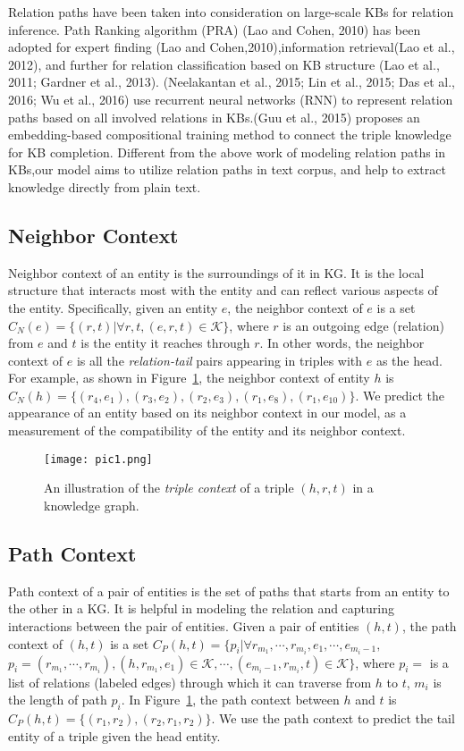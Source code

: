 Relation paths have been taken into consideration on large-scale KBs for relation inference. Path Ranking algorithm (PRA) (Lao and Cohen, 2010) has been adopted for expert finding (Lao and Cohen,2010),information retrieval(Lao et al., 2012), and further for relation classification based on KB structure (Lao et al., 2011; Gardner et al., 2013). (Neelakantan et al., 2015; Lin et al., 2015; Das et al., 2016; Wu et al., 2016) use recurrent neural networks (RNN) to represent relation paths based on all involved relations in KBs.(Guu et al., 2015) proposes an embedding-based compositional training method to connect the triple knowledge for KB completion. Different from the above work of modeling relation paths in KBs,our model aims to utilize relation paths in text corpus, and help to extract knowledge directly from plain text.

\subsection{Neighbor Context}
Neighbor context of an entity is the surroundings of it in KG. It is the local structure that interacts most with the entity and can reflect various aspects of the entity. Specifically, given an entity $e$, the neighbor context of $e$ is a set $C_N(e)=\{(r,t)|\forall r, t, (e,r,t)\in\mathcal{K}\}$, where $r$ is an outgoing edge (relation) from $e$ and $t$ is the entity it reaches through $r$. In other words, the neighbor context of $e$ is all the \textit{relation-tail} pairs appearing in triples with $e$ as the head. For example, as shown in Figure~\ref{pic1}, the neighbor context of entity $h$ is $C_N(h)=\{(r_4, e_1), (r_3, e_2), (r_2, e_3), (r_1, e_8), (r_1, e_{10})\}$. We predict the appearance of an entity based on its neighbor context in our model, as a measurement of the compatibility of the entity and its neighbor context.

\begin{figure}
  \texttt{[image: pic1.png]}
  \caption{An illustration of the \emph{triple context} of a triple $(h,r,t)$ in a knowledge graph.}
  \label{pic1}
\end{figure}


\subsection{Path Context}
Path context of a pair of entities is the set of paths that starts from an entity to the other in a KG. It is helpful in modeling the relation and capturing interactions between the pair of entities. Given a pair of entities $(h,t)$, the path context of $(h,t)$ is a set $C_P(h,t)=\{p_i | \forall r_{m_1}, \cdots, r_{m_i}, e_1, \cdots, e_{m_i-1},$ $p_i=(r_{m_1}, \cdots, r_{m_i}), (h,r_{m_1},e_1)\in\mathcal{K}, \cdots, (e_{m_i-1}, r_{m_i}, t)\in\mathcal{K}\}$, where $p_i=$ is a list of relations (labeled edges) through which it can traverse from $h$ to $t$, $m_i$ is the length of path $p_i$. In Figure~\ref{pic1}, the path context between $h$ and $t$ is $C_P(h,t) = \{(r_1, r_2), (r_2, r_1, r_2)\}$. We use the path context to predict the tail entity of a triple given the head entity.


